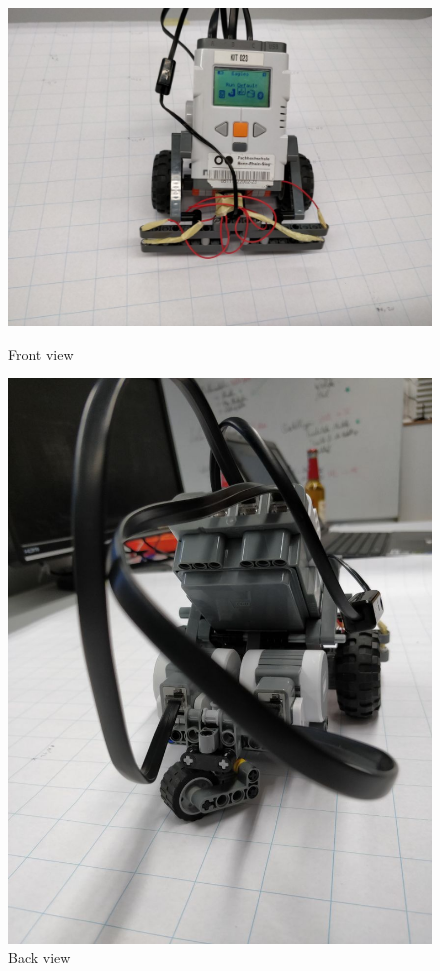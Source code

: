 \documentclass[11pt,a4paper,openright,twoside]{extreport}
\begin{document}
\begin{figure}[ht]
  \begin{minipage}[b]{0.5\textwidth}
    \centering
    \includegraphics[width=.9\textwidth]{front.jpeg}
    \captionsetup{labelformat=empty}
    \caption{Front view} 
    \vspace{4ex}
  \end{minipage}%
  \begin{minipage}[b]{0.5\textwidth}
    \centering
    \includegraphics[width=.6\textwidth]{back.jpeg}
    \captionsetup{labelformat=empty}
    \caption{Back view} 
    \vspace{4ex}
  \end{minipage} 
  \begin{minipage}[b]{0.5\textwidth}

\end{minipage}
\end{figure}
\end{document}
